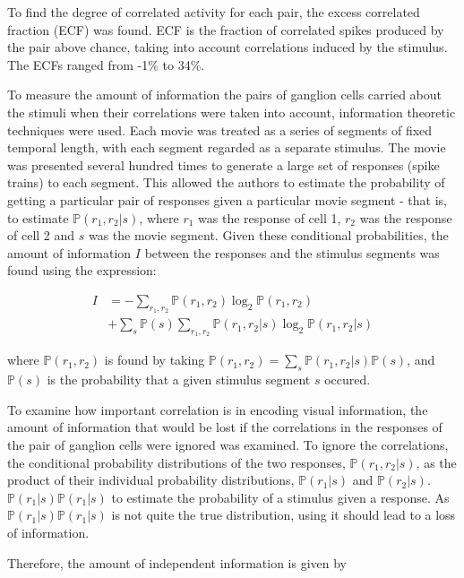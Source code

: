 \documentclass[twoside]{article}
\begin{document}
\begin{multicols}{2}
To find the degree of correlated activity for each pair, the excess correlated fraction (ECF) was found. ECF is the fraction of correlated spikes produced by the pair above chance, taking into account correlations induced by the stimulus. The ECFs ranged from -1\% to 34\%. 

To measure the amount of information the pairs of ganglion cells carried about the stimuli when their correlations were taken into account, information theoretic techniques were used. Each movie was treated as a series of segments of fixed temporal length, with each segment regarded as a separate stimulus. The movie was presented several hundred times to generate a large set of responses (spike trains) to each segment. This allowed the authors to estimate the probability of getting a particular pair of responses given a particular movie segment - that is, to estimate $\mathbb{P}(r_1,r_2|s)$, where $r_1$ was the response of cell 1, $r_2$ was the response of cell 2 and $s$ was the movie segment. Given these conditional probabilities, the amount of information $I$ between the responses and the stimulus segments was found using the expression:


\begin{align}\label{eq:info-theory}
	I 
		&= -\sum_{r_1,r_2}\mathbb{P}(r_1,r_2)\log_2\mathbb{P}(r_1,r_2) \\
  		&+ \sum_s\mathbb{P}(s) \sum_{r_1,r_2}\mathbb{P}(r_1,r_2|s)\log_2\mathbb{P}(r_1,r_2|s)
\end{align}


where $\mathbb{P}(r_1,r_2)$ is found by taking $\mathbb{P}(r_1,r_2) = \sum_s \mathbb{P}(r_1,r_2|s)\mathbb{P}(s)$, and $\mathbb{P}(s)$ is the probability that a given stimulus segment $s$ occured. 

To examine how important correlation is in encoding visual information, the amount of information that would be lost if the correlations in the responses of the pair of ganglion cells were ignored was examined. To ignore the correlations, the conditional probability distributions of the two responses, $\mathbb{P}(r_1,r_2|s)$, as the product of their individual probability distributions, $\mathbb{P}(r_1|s)$ and $\mathbb{P}(r_2|s)$. $\mathbb{P}(r_1|s)\mathbb{P}(r_1|s)$ to estimate the probability of a stimulus given a response. As $\mathbb{P}(r_1|s)\mathbb{P}(r_1|s)$ is not quite the true distribution, using it should lead to a loss of information. 

Therefore, the amount of independent information is given by


\end{multicols}
\end{document}
